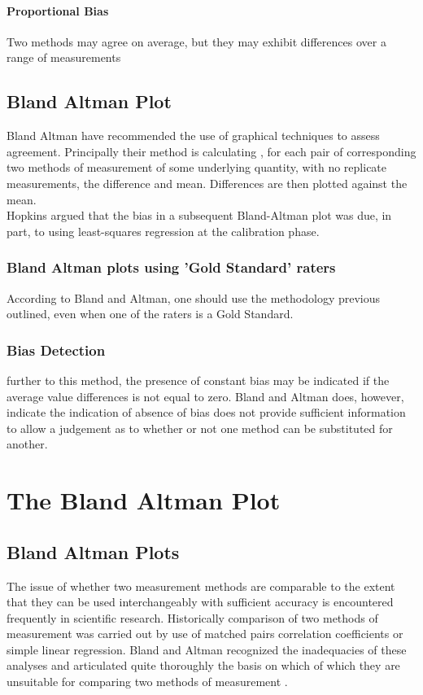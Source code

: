 \documentclass[12pt, a4paper]{report}
\begin{document}
\subsubsection*{Proportional Bias} Two methods may agree on
average, but they may exhibit differences over a range of
measurements\section{Bland Altman Plot} Bland Altman have
recommended the use of graphical techniques to assess agreement.
Principally their method is calculating , for each pair of
corresponding two methods of measurement of some underlying
quantity, with no replicate measurements, the difference and mean.
Differences are then plotted against the mean.
\\
Hopkins argued that the bias in a subsequent Bland-Altman plot was
due, in part, to using least-squares regression at the calibration
phase.

\subsection{Bland Altman plots using 'Gold Standard' raters}
According to Bland and Altman, one should use the methodology
previous outlined, even when one of the raters is a Gold Standard.


\subsection{Bias Detection}
further to this method, the presence of constant bias may be
indicated if the average value differences is not equal to zero.
Bland and Altman does, however, indicate the indication of absence
of bias does not provide sufficient information to allow a
judgement as to whether or not one method can be substituted for
another.


\chapter{The Bland Altman Plot}
\section{Bland Altman Plots}
The issue of whether two measurement methods are comparable to the
extent that they can be used interchangeably with sufficient
accuracy is encountered frequently in scientific research.
Historically comparison of two methods of measurement was carried
out by use of matched pairs correlation coefficients or simple
linear regression. Bland and Altman recognized the inadequacies of
these analyses and articulated quite thoroughly the basis on which
of which they are unsuitable for comparing two methods of
measurement \citep*{BA83}.
\end{document}
